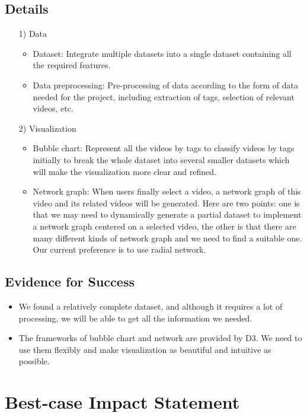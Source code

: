 \documentclass{proc}
\begin{document}
\subsection{Details}
\begin{itemize}
    \item [1)]
    Data
    \begin{itemize}
        \item Dataset: Integrate multiple datasets into a single dataset containing all the required features.
        \item Data preprocessing: Pre-processing of data according to the form of data needed for the project, including extraction of tags, selection of relevant videos, etc.
    \end{itemize}
    \item [2)]
    Visualization
    \begin{itemize}
        \item Bubble chart: Represent all the videos by tags to classify videos by tags initially to break the whole dataset into several smaller datasets which will make the visualization more clear and refined.
        \item Network graph: When users finally select a video, a network graph of this video and its related videos will be generated. Here are two points: one is that we may need to dynamically generate a partial dataset to implement a network graph centered on a selected video, the other is that there are many different kinds of network graph and we need to find a suitable one. Our current preference is to use radial network.
    \end{itemize}
\end{itemize}

\subsection{Evidence for Success}
\begin{itemize}
    \item We found a relatively complete dataset, and although it requires a lot of processing, we will be able to get all the information we needed.
    \item The frameworks of bubble chart and network are provided by D3. We need to use them flexibly and make visualization as beautiful and intuitive as possible.
\end{itemize}

\section{Best-case Impact Statement}
\end{document}
